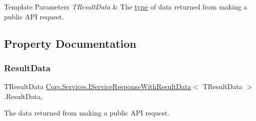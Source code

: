 \begin{DoxyTemplParams}{Template Parameters}
{\em T\+Result\+Data} & The \hyperlink{}{type} of data returned from making a public A\+PI request.\\
\hline
\end{DoxyTemplParams}


\subsection{Property Documentation}
\mbox{\label{interfaceCqrs_1_1Services_1_1IServiceResponseWithResultData_a9cca2c2341cc95f3c55fb2058c240dd1}} 
\subsubsection{\texorpdfstring{Result\+Data}{ResultData}}
{\footnotesize\ttfamily T\+Result\+Data \hyperlink{interfaceCqrs_1_1Services_1_1IServiceResponseWithResultData}{Cqrs.\+Services.\+I\+Service\+Response\+With\+Result\+Data}$<$ T\+Result\+Data $>$.Result\+Data\hspace{0.3cm}{\ttfamily [get]}, {\ttfamily [set]}}



The data returned from making a public A\+PI request. 

